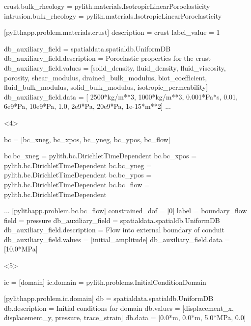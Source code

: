 \documentclass[aspectratio=169]{beamer}
\begin{document}
\begin{frame}[t,fragile]
\begin{minipage}[t]{0.67\textwidth}
\begin{onlyenv}
\begin{cfgcode}
        crust.bulk_rheology = pylith.materials.IsotropicLinearPoroelasticity
        intrusion.bulk_rheology = pylith.materials.IsotropicLinearPoroelasticity

        [pylithapp.problem.materials.crust]
        description = crust
        label_value = 1

        db_auxiliary_field = spatialdata.spatialdb.UniformDB
        db_auxiliary_field.description = Poroelastic properties for the crust
        db_auxiliary_field.values = [solid_density, fluid_density, fluid_viscosity, porosity, shear_modulus, drained_bulk_modulus, biot_coefficient, fluid_bulk_modulus, solid_bulk_modulus, isotropic_permeability]
        db_auxiliary_field.data   = [ 2500*kg/m**3,  1000*kg/m**3,      0.001*Pa*s,     0.01,        6e9*Pa,              10e9*Pa,              1.0,             2e9*Pa,            20e9*Pa,             1e-15*m**2]
        ...
      \end{cfgcode}
    \end{onlyenv}
    \begin{onlyenv}<4>
      \begin{cfgcode}
        bc = [bc_xneg, bc_xpos, bc_yneg, bc_ypos, bc_flow]

        bc.bc_xneg = pylith.bc.DirichletTimeDependent
        bc.bc_xpos = pylith.bc.DirichletTimeDependent
        bc.bc_yneg = pylith.bc.DirichletTimeDependent
        bc.bc_ypos = pylith.bc.DirichletTimeDependent
        bc.bc_flow = pylith.bc.DirichletTimeDependent

        ...
        [pylithapp.problem.bc.bc_flow]
        constrained_dof = [0]
        label = boundary_flow
        field = pressure
        db_auxiliary_field = spatialdata.spatialdb.UniformDB
        db_auxiliary_field.description = Flow into external boundary of conduit
        db_auxiliary_field.values = [initial_amplitude]
        db_auxiliary_field.data = [10.0*MPa]
      \end{cfgcode}
    \end{onlyenv}
    \begin{onlyenv}<5>
      \begin{cfgcode}
        ic = [domain]
        ic.domain = pylith.problems.InitialConditionDomain

        [pylithapp.problem.ic.domain]
        db = spatialdata.spatialdb.UniformDB
        db.description = Initial conditions for domain
        db.values = [displacement_x, displacement_y, pressure, trace_strain]
        db.data = [0.0*m, 0.0*m, 5.0*MPa, 0.0]
      \end{cfgcode}
    \end{onlyenv}
  \end{minipage}


\end{frame}
\end{document}
